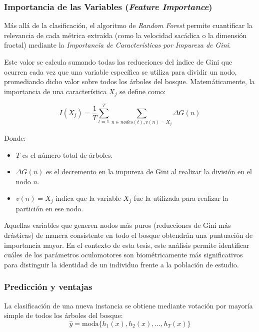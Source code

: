 \subsubsection{Importancia de las Variables (\textit{Feature Importance})}

Más allá de la clasificación, el algoritmo de \textit{Random Forest} permite cuantificar la relevancia de cada métrica extraída (como la velocidad sacádica o la dimensión fractal) mediante la \textit{Importancia de Características por Impureza de Gini}.

Este valor se calcula sumando todas las reducciones del índice de Gini que ocurren cada vez que una variable específica se utiliza para dividir un nodo, promediando dicho valor sobre todos los árboles del bosque. Matemáticamente, la importancia de una característica $X_j$ se define como:

\begin{equation}
	I(X_j) = \frac{1}{T} \sum_{t=1}^{T} \sum_{n \in nodes(t), v(n)=X_j} \Delta G(n)
\end{equation}

Donde:
\begin{itemize}
	\item $T$ es el número total de árboles.
	\item $\Delta G(n)$ es el decremento en la impureza de Gini al realizar la división en el nodo $n$.
	\item $v(n)=X_j$ indica que la variable $X_j$ fue la utilizada para realizar la partición en ese nodo.
\end{itemize}

Aquellas variables que generen nodos más puros (reducciones de Gini más drásticas) de manera consistente en todo el bosque obtendrán una puntuación de importancia mayor. En el contexto de esta tesis, este análisis permite identificar cuáles de los parámetros oculomotores son biométricamente más significativos para distinguir la identidad de un individuo frente a la población de estudio.

\subsubsection{Predicción y ventajas}

La clasificación de una nueva instancia se obtiene mediante votación por mayoría simple de todos los árboles del bosque:
\begin{equation}
	\hat{y} = \text{moda}\{h_1(x), h_2(x), ..., h_T(x)\}
\end{equation}

